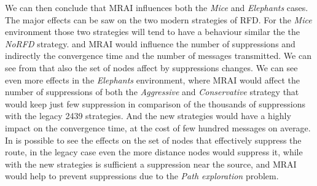 We can then conclude that \ac{MRAI} influences both the \textit{Mice} and
\textit{Elephants} cases.
The major effects can be saw on the two modern strategies of \ac{RFD}.
For the \textit{Mice} environment those two strategies will tend to have 
a behaviour similar the the \textit{NoRFD} strategy. and \ac{MRAI} would
influence the number of suppressions and indirectly the convergence time
and the number of messages transmitted.
We can see from  that also the set of
nodes affect by suppressions changes.
We can see even more effects in the \textit{Elephants} environment, where 
\ac{MRAI} would affect the number of suppressions of both the \textit{Aggressive}
and \textit{Conservative} strategy that would keep just few suppression in
comparison of the thousands of suppressions with the legacy \num{2439} strategies.
And the new strategies would have a highly impact on the convergence time, at
the cost of few hundred messages on average.
In  is possible to see the effects
on the set of nodes that effectively suppress the route, in the legacy
case even the more distance nodes would suppress it, while with the new
strategies is sufficient a suppression near the source, and \ac{MRAI} would
help to prevent suppressions due to the \textit{Path exploration} problem.

